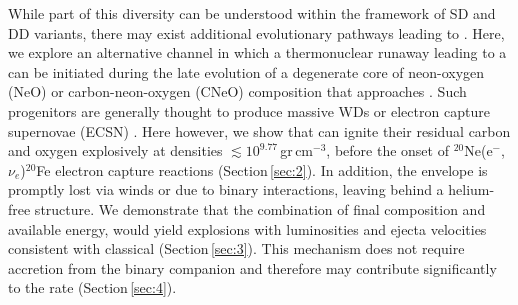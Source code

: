 \documentclass[twocolumn,tighten,times]{aastex62}
\begin{document}
While part of this diversity can be understood within the framework of SD and DD 
variants, there may exist additional 
evolutionary pathways leading to \ias. 
Here, we explore an alternative channel in which a thermonuclear runaway leading to a \ia can be initiated during the late evolution of a degenerate core of neon-oxygen 
(NeO) or carbon-neon-oxygen (CNeO) composition that approaches  \mch. 
Such progenitors are generally thought to produce massive WDs or     
electron capture supernovae (ECSN)  
\citep[e.g.,][]{nomoto1991,gutierrez1996,Takahashi:2013ena}. %
Here however, we show that  can ignite their residual carbon and oxygen explosively at  
densities $\lesssim 10^{9.77}$\,gr\,cm$^{-3}$, 
before the onset of {\rm $^{20}$Ne(e$^-$,$\nu_e$)$^{20}$Fe} 
electron capture reactions (Section\,\ref{sec:2}). 
In addition, the envelope is promptly lost via winds or due to binary interactions, leaving behind a helium-free structure.  
We demonstrate that the combination of 
final composition and available energy, 
would yield explosions with luminosities and ejecta velocities 
consistent with classical \ias (Section\,\ref{sec:3}). 
 This mechanism  does not require accretion from the binary companion and 
 therefore may contribute significantly to the \ia  rate  (Section\,\ref{sec:4}). 
 
\end{document}

